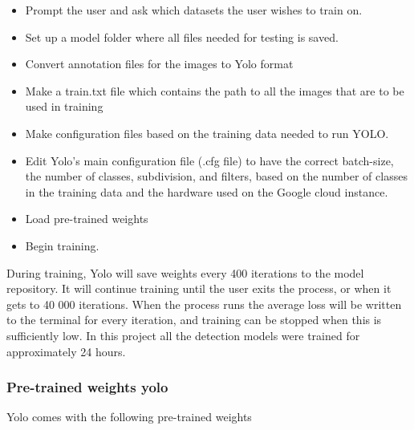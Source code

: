 \begin{itemize}
    \item Prompt the user and ask which datasets the user wishes to train on.
    \item Set up a model folder where all files needed for testing is saved.
    \item Convert annotation files for the images to Yolo format
    \item Make a train.txt file which contains the path to all the images that are to be used in training
    \item Make configuration files based on the training data needed to run YOLO.
    \item Edit Yolo's main configuration file (.cfg file) to have the correct batch-size, the number of classes, subdivision, and filters, based on the number of classes in the training data and the hardware used on the Google cloud instance.
    \item Load pre-trained weights
    \item Begin training.
\end{itemize}

During training, Yolo will save weights every 400 iterations to the model repository. It will continue training until the user exits the process, or when it gets to 40 000 iterations. When the process runs the average loss will be written to the terminal for every iteration, and training can be stopped when this is sufficiently low. In this project all the detection models were trained for approximately 24 hours.

\newpage

\subsubsection{Pre-trained weights yolo}
Yolo comes with the following pre-trained weights

